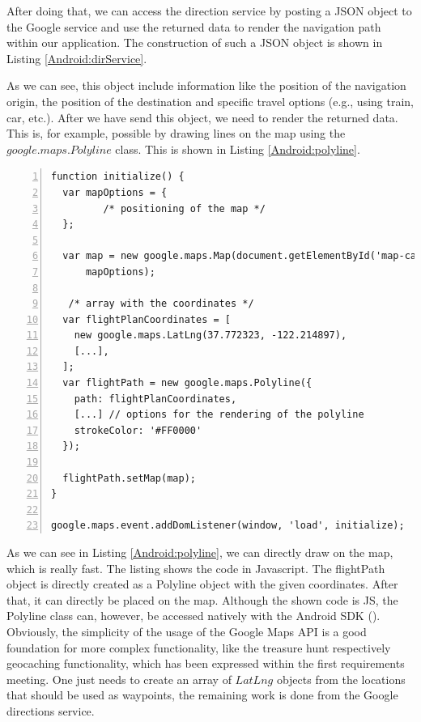 After doing that, we can access the direction service by posting a \ac{JSON} object to the Google service and use the returned data to render the navigation path within our application. The construction of such a \ac{JSON} object is shown in Listing \ref{Android:dirService}. 

As we can see, this object include information like the position of the navigation origin, the position of the destination and specific travel options (e.g., using train, car, etc.). After we have send this object, we need to render the returned data. This is, for example, possible by drawing lines on the map using the $google.maps.Polyline$ class. This is shown in Listing \ref{Android:polyline}.

\begin{lstlisting}[numbers=left,caption={Example for writing a poly line on the google map},label=Android:polyline,frame=tlbr,breaklines]
function initialize() {
  var mapOptions = {
         /* positioning of the map */
  };

  var map = new google.maps.Map(document.getElementById('map-canvas'),
      mapOptions);

   /* array with the coordinates */
  var flightPlanCoordinates = [
    new google.maps.LatLng(37.772323, -122.214897),
    [...],
  ];
  var flightPath = new google.maps.Polyline({
    path: flightPlanCoordinates,
    [...] // options for the rendering of the polyline
    strokeColor: '#FF0000'
  });

  flightPath.setMap(map);
}

google.maps.event.addDomListener(window, 'load', initialize);
\end{lstlisting}

As we can see in Listing \ref{Android:polyline}, we can directly draw on the map, which is really fast. The listing shows the code in Javascript. The flightPath object is directly created as a Polyline object with the given coordinates. After that, it can directly be placed on the map. Although the shown code is \ac{JS}, the Polyline class can, however, be accessed natively with the Android SDK (\cite{GooglePolylineNative}). Obviously, the simplicity of the usage of the Google Maps API is a good foundation for more complex functionality, like the treasure hunt respectively geocaching functionality, which has been expressed within the first requirements meeting. One just needs to create an array of $LatLng$ objects from the locations that should be used as waypoints, the remaining work is done from the Google directions service.  

